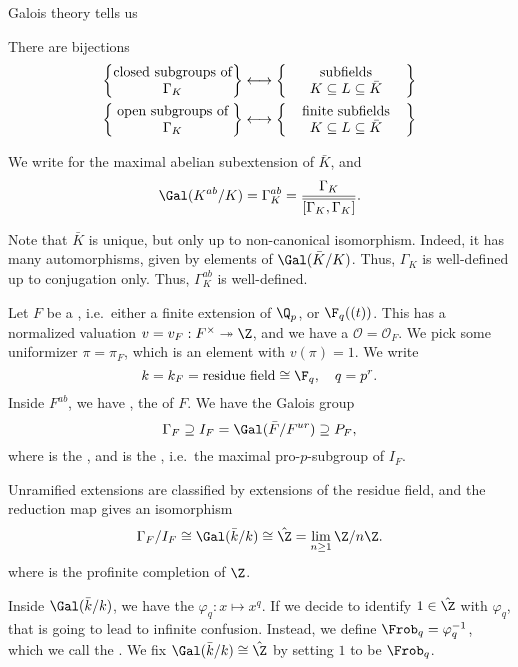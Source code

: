 \documentclass[a4paper]{article}
\begin{document}
Galois theory tells us
\begin{thm}
  There are bijections
  \begin{align*}
    \left\{\parbox{3cm}{\centering closed subgroups of $\Gamma_K$}\right\} &\longleftrightarrow \left\{\parbox{3cm}{\centering subfields $K \subseteq L \subseteq \bar{K}$}\right\}\\
    \left\{\parbox{3cm}{\centering open subgroups of $\Gamma_K$}\right\} &\longleftrightarrow \left\{\parbox{3cm}{\centering finite subfields $K \subseteq L \subseteq \bar{K}$}\right\}
  \end{align*}
\end{thm}

\begin{notation}
  We write  for the maximal abelian subextension of $\bar{K}$, and
  \[
    \Gal(K^{ab}/K) = \Gamma_K^{ab} = \frac{\Gamma_K}{\overline{[\Gamma_K, \Gamma_K]}}.
  \]
\end{notation}
Note that $\bar{K}$ is unique, but only up to non-canonical isomorphism. Indeed, it has many automorphisms, given by elements of $\Gal(\bar{K}/K)$. Thus, $\Gamma_K$ is well-defined up to conjugation only. Thus, $\Gamma_K^{ab}$ is well-defined.

Let $F$ be a , i.e.\ either a finite extension of $\Q_p$, or $\F_q((t))$. This has a normalized valuation $v = v_F: F^\times \twoheadrightarrow \Z$, and we have a  $\mathcal{O} = \mathcal{O}_F$. We pick some uniformizer $\pi = \pi_F$, which is an element with $v(\pi) = 1$. We write
\[
  k = k_F = \text{residue field} \cong \F_q,\quad q = p^r.
\]
Inside $F^{ab}$, we have , the  of $F$. We have the Galois group
\[
  \Gamma_F \supseteq I_F = \Gal(\bar{F}/F^{ur}) \supseteq P_F,
\]
where  is the , and  is the , i.e.\ the maximal pro-$p$-subgroup of $I_F$.

Unramified extensions are classified by extensions of the residue field, and the reduction map gives an isomorphism
\[
  \Gamma_F/I_F \cong \Gal(\bar{k}/k) \cong \hat{\Z} = \lim_{n \geq 1} \Z/n\Z.
\]
where  is the profinite completion of $\Z$.

Inside $\Gal(\bar{k}/k)$, we have the  $\varphi_q: x \mapsto x^q$. If we decide to identify $1 \in \hat{\Z}$ with $\varphi_q$, that is going to lead to infinite confusion. Instead, we define $\Frob_q = \varphi_q^{-1}$, which we call the . We fix $\Gal(\bar{k}/k) \cong \hat{\Z}$ by setting $1$ to be $\Frob_q$.
\end{document}
